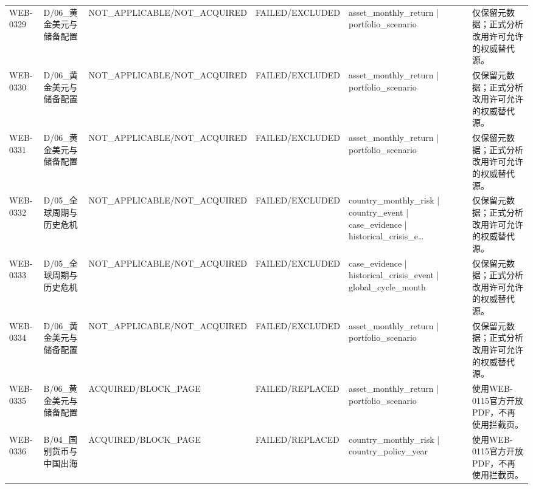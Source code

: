 \begin{landscape}
\begin{longtable}{p{1.8cm}p{2.6cm}p{2.6cm}p{2.6cm}p{4.8cm}p{7.2cm}}
WEB-0329 & D/\allowbreak{}06\_\allowbreak{}黄金美元与储备配置 & NOT\_\allowbreak{}APPLICABLE/\allowbreak{}NOT\_\allowbreak{}ACQUIRED & FAILED/\allowbreak{}EXCLUDED & asset\_\allowbreak{}monthly\_\allowbreak{}return | portfolio\_\allowbreak{}scenario & 仅保留元数据；正式分析改用许可允许的权威替代源。\\
WEB-0330 & D/\allowbreak{}06\_\allowbreak{}黄金美元与储备配置 & NOT\_\allowbreak{}APPLICABLE/\allowbreak{}NOT\_\allowbreak{}ACQUIRED & FAILED/\allowbreak{}EXCLUDED & asset\_\allowbreak{}monthly\_\allowbreak{}return | portfolio\_\allowbreak{}scenario & 仅保留元数据；正式分析改用许可允许的权威替代源。\\
WEB-0331 & D/\allowbreak{}06\_\allowbreak{}黄金美元与储备配置 & NOT\_\allowbreak{}APPLICABLE/\allowbreak{}NOT\_\allowbreak{}ACQUIRED & FAILED/\allowbreak{}EXCLUDED & asset\_\allowbreak{}monthly\_\allowbreak{}return | portfolio\_\allowbreak{}scenario & 仅保留元数据；正式分析改用许可允许的权威替代源。\\
WEB-0332 & D/\allowbreak{}05\_\allowbreak{}全球周期与历史危机 & NOT\_\allowbreak{}APPLICABLE/\allowbreak{}NOT\_\allowbreak{}ACQUIRED & FAILED/\allowbreak{}EXCLUDED & country\_\allowbreak{}monthly\_\allowbreak{}risk | country\_\allowbreak{}event | case\_\allowbreak{}evidence | historical\_\allowbreak{}crisis\_\allowbreak{}e… & 仅保留元数据；正式分析改用许可允许的权威替代源。\\
WEB-0333 & D/\allowbreak{}05\_\allowbreak{}全球周期与历史危机 & NOT\_\allowbreak{}APPLICABLE/\allowbreak{}NOT\_\allowbreak{}ACQUIRED & FAILED/\allowbreak{}EXCLUDED & case\_\allowbreak{}evidence | historical\_\allowbreak{}crisis\_\allowbreak{}event | global\_\allowbreak{}cycle\_\allowbreak{}month & 仅保留元数据；正式分析改用许可允许的权威替代源。\\
WEB-0334 & D/\allowbreak{}06\_\allowbreak{}黄金美元与储备配置 & NOT\_\allowbreak{}APPLICABLE/\allowbreak{}NOT\_\allowbreak{}ACQUIRED & FAILED/\allowbreak{}EXCLUDED & asset\_\allowbreak{}monthly\_\allowbreak{}return | portfolio\_\allowbreak{}scenario & 仅保留元数据；正式分析改用许可允许的权威替代源。\\
WEB-0335 & B/\allowbreak{}06\_\allowbreak{}黄金美元与储备配置 & ACQUIRED/\allowbreak{}BLOCK\_\allowbreak{}PAGE & FAILED/\allowbreak{}REPLACED & asset\_\allowbreak{}monthly\_\allowbreak{}return | portfolio\_\allowbreak{}scenario & 使用WEB-0115官方开放PDF，不再使用拦截页。\\
WEB-0336 & B/\allowbreak{}04\_\allowbreak{}国别货币与中国出海 & ACQUIRED/\allowbreak{}BLOCK\_\allowbreak{}PAGE & FAILED/\allowbreak{}REPLACED & country\_\allowbreak{}monthly\_\allowbreak{}risk | country\_\allowbreak{}policy\_\allowbreak{}year & 使用WEB-0115官方开放PDF，不再使用拦截页。\\

\end{longtable}
\end{landscape}
